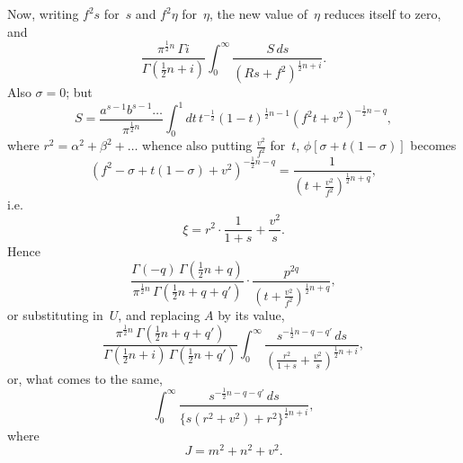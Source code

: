 \documentclass[11pt,a4paper]{book}
\begin{document}
Now, writing $f^2s$ for~$s$ and $f^2\eta$ for~$\eta$, the new value of~$\eta$ reduces itself to zero, and
\[
\frac{\pi^{\frac{1}{2}n}\,\Gamma i}{\Gamma(\frac{1}{2}n+i)} \int_0^\infty \frac{S\,ds}{(Rs+f^2)^{\frac{1}{2}n+i}}.
\]
Also $\sigma = 0$; but
\[
S = \frac{a^{s-1}b^{s-1}\ldots}{\pi^{\frac{1}{2}n}} \int_0^1 dt \, t^{-\frac{1}{2}}(1-t)^{\frac{1}{2}n-1} (f^2t + v^2)^{-\frac{1}{2}n-q},
\]
where $r^2 = \alpha^2 + \beta^2 + \ldots$ whence also putting $\frac{v^2}{f^2}$ for~$t$, $\phi[\sigma + t(1-\sigma)]$ becomes
\[
(f^2 - \sigma + t(1-\sigma) + v^2)^{-\frac{1}{2}n-q} = \frac{1}{(t + \frac{v^2}{f^2})^{\frac{1}{2}n+q}},
\]
i.e.
\[
\xi = r^2 \cdot \frac{1}{1+s} + \frac{v^2}{s}.
\]
Hence
\[
\frac{\Gamma(-q)\,\Gamma(\frac{1}{2}n+q)}{\pi^{\frac{1}{2}n}\,\Gamma(\frac{1}{2}n+q+q')} \cdot \frac{p^{2q}}{(t + \frac{v^2}{f^2})^{\frac{1}{2}n+q}},
\]
or substituting in~$U$, and replacing $A$ by its value,
\[
\frac{\pi^{\frac{1}{2}n}\,\Gamma(\frac{1}{2}n+q+q')}{\Gamma(\frac{1}{2}n+i)\,\Gamma(\frac{1}{2}n+q')} \int_0^\infty \frac{s^{-\frac{1}{2}n-q-q'}\,ds}{\left(\frac{r^2}{1+s} + \frac{v^2}{s}\right)^{\frac{1}{2}n+i}},
\]
or, what comes to the same,
\[
\int_0^\infty \frac{s^{-\frac{1}{2}n-q-q'}\,ds}{\{s(r^2+v^2) + r^2\}^{\frac{1}{2}n+i}},
\]
where
\[
J = m^2 + n^2 + v^2.
\]
\end{document}
